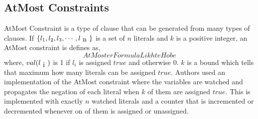 \subsection{AtMost Constraints}
AtMost Constraint is a type of clause that can be generated from many types of clauses. If $\{l_{1}, l_{2}, l_{3},\cdots ,l_{\text n}\}$ is a set of $n$ literals and $k$ is a positive integer, an AtMost constraint is defines as,
$$AtMosterFormulaLikhteHobe$$
where, $val(l_{\text i})$ is 1 if $l_{i}$ is assigned $true$ and otherwise 0. $k$ is a bound which tells that maximum how many literals can be assigned $true$.
Authors used an implementation of the AtMost constraint where the variables are watched and propagates the negation of each literal when $k$ of them are assigned $true$. This is implemented with exactly $n$ watched literals and a counter that is incremented or decremented whenever on of them is assigned or unassigned.



